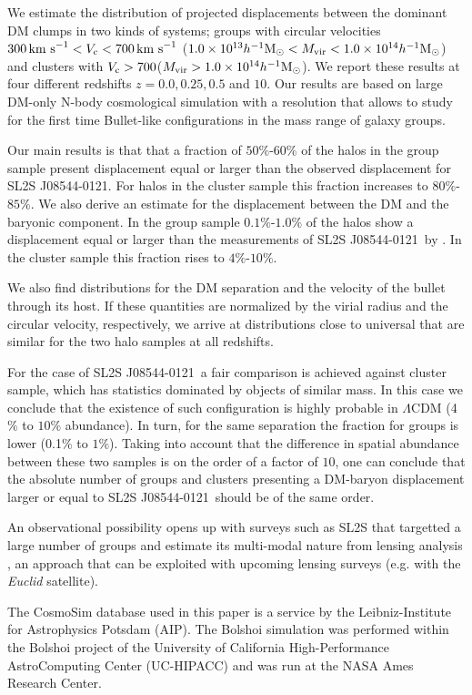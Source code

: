 \documentclass{emulateapj}
\newcommand{\hMsun}{{\ifmmode{h^{-1}{\rm {M_{\odot}}}}\else{$h^{-1}{\rm{M_{\odot}}}$}\fi}}
\newcommand{\kms}{{\ifmmode{{\mathrm{\,km\ s}^{-1}}}\else{\,km~s$^{-1}$}\fi}}
\newcommand{\bullg}{SL2S J08544-0121}
\begin{document}
We estimate the distribution of projected displacements
between the dominant DM clumps in two kinds of systems; groups with
circular velocities $300\kms<V_{\rm c}<700\kms$ ($1.0\times
10^{13}\hMsun < M_{\rm vir}<1.0\times 10^{14}\hMsun$) and clusters with $V_{\rm
  c}>700$\kms ($M_{\rm vir}>1.0\times 10^{14}\hMsun$). We report these
results at four different redshifts $z=0.0,0.25,0.5$ and $10$. Our
results are based on large DM-only N-body cosmological simulation with
a resolution that allows to study for the first time Bullet-like
configurations in the mass range of galaxy groups. 


Our main results is that that a fraction of $50\%$-$60\%$ of the halos
in the group sample present displacement equal or larger than the
observed displacement for \bullg. For halos in the cluster sample this
fraction increases to $80\%$-$85\%$. We also derive an
estimate for the displacement between the DM and the baryonic
component. In the group sample $0.1\%$-$1.0\%$ of the halos show a
displacement equal or larger than  the  measurements of \bullg\ by
\citep{Gastaldello}. In the cluster sample this fraction rises to
$4\%$-$10\%$. 

We also find distributions for the DM separation and the velocity of
the bullet through its host. If these quantities are normalized by the
virial radius and the circular velocity, respectively, we arrive at
distributions close to universal that are similar for the two halo
samples at all redshifts.

For the case of \bullg\ a fair comparison is achieved against cluster
sample, which has statistics dominated by objects of similar mass. In
this case we conclude that the existence of such configuration is
highly probable in $\Lambda$CDM (4$\%$ to $10\%$ abundance). In turn,
for the same separation the fraction for groups is lower (0.1$\%$ to
$1\%$). Taking into account that the difference in spatial abundance
between these two samples is on the order of a factor of $10$, one can
conclude that the absolute number of groups and clusters presenting a
DM-baryon displacement larger or equal to \bullg\ should be of the
same order. 

 
An observational possibility opens up with surveys such as SL2S that
targetted a large number of groups and estimate its multi-modal nature
from lensing analysis \citep{Foex2013}, an approach that can be
exploited with upcoming lensing surveys (e.g. with the {\it Euclid}
satellite). 

The CosmoSim database used in this paper is a service by the
Leibniz-Institute for Astrophysics Potsdam (AIP). The  Bolshoi
simulation was performed within the Bolshoi project of the University
of California High-Performance AstroComputing Center (UC-HIPACC) and
was run at the NASA Ames Research Center. 
\end{document}
